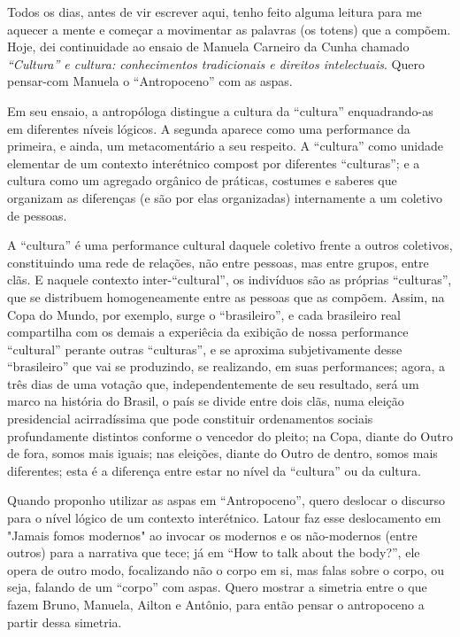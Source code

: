 
Todos os dias, antes de vir escrever aqui, tenho feito alguma leitura para me aquecer a mente e começar a movimentar as palavras (os totens) que a compõem. Hoje, dei continuidade ao ensaio de Manuela Carneiro da Cunha chamado \textit{\enquote{Cultura} e cultura: conhecimentos tradicionais e direitos intelectuais}. Quero pensar-com Manuela o \enquote{Antropoceno} com as aspas.

Em seu ensaio, a antropóloga distingue a cultura da \enquote{cultura} enquadrando-as em diferentes níveis lógicos. A segunda aparece como uma performance da primeira, e ainda, um metacomentário a seu respeito. A \enquote{cultura} como unidade elementar de um contexto interétnico compost por diferentes \enquote{culturas}; e a cultura como um agregado orgânico de práticas, costumes e saberes que organizam as diferenças (e são por elas organizadas) internamente a um coletivo de pessoas.

A \enquote{cultura} é uma performance cultural daquele coletivo frente a outros coletivos, constituindo uma rede de relações, não entre pessoas, mas entre grupos, entre clãs. E naquele contexto inter-\enquote{cultural}, os indivíduos são as próprias \enquote{culturas}, que se distribuem homogeneamente entre as pessoas que as compõem. Assim, na Copa do Mundo, por exemplo, surge o \enquote{brasileiro}, e cada brasileiro real compartilha com os demais a experiêcia da exibição de nossa performance \enquote{cultural} perante outras \enquote{culturas}, e se aproxima subjetivamente desse \enquote{brasileiro} que vai se produzindo, se realizando, em suas performances; agora, a três dias de uma votação que, independentemente de seu resultado, será um marco na história do Brasil, o país se divide entre dois clãs, numa eleição presidencial acirradíssima que pode constituir ordenamentos sociais profundamente distintos conforme o vencedor do pleito; na Copa, diante do Outro de fora, somos mais iguais; nas eleições, diante do Outro de dentro, somos mais diferentes; esta é a diferença entre estar no nível da \enquote{cultura} ou da cultura.

Quando proponho utilizar as aspas em \enquote{Antropoceno}, quero deslocar o discurso para o nível lógico de um contexto interétnico. Latour faz esse deslocamento em "Jamais fomos modernos" ao invocar os modernos e os não-modernos (entre outros) para a narrativa que tece; já em \enquote{How to talk about the body?}, ele opera de outro modo, focalizando não o corpo em si, mas \guillemetleft falas sobre o corpo\guillemetright, ou seja, falando de um \enquote{corpo} com aspas. Quero mostrar a simetria entre o que fazem Bruno, Manuela, Ailton e Antônio, para então pensar o antropoceno a partir dessa simetria.

